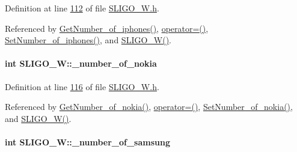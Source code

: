 Definition at line \hyperlink{_s_l_i_g_o___w_8h_source_l00112}{112} of file \hyperlink{_s_l_i_g_o___w_8h_source}{S\+L\+I\+G\+O\+\_\+\+W.\+h}.



Referenced by \hyperlink{_s_l_i_g_o___w_8cpp_source_l00113}{Get\+Number\+\_\+of\+\_\+iphones()}, \hyperlink{_s_l_i_g_o___w_8h_source_l00075}{operator=()}, \hyperlink{_s_l_i_g_o___w_8cpp_source_l00109}{Set\+Number\+\_\+of\+\_\+iphones()}, and \hyperlink{_s_l_i_g_o___w_8h_source_l00024}{S\+L\+I\+G\+O\+\_\+\+W()}.

\paragraph[{\texorpdfstring{\+\_\+number\+\_\+of\+\_\+nokia}{_number_of_nokia}}]{\setlength{\rightskip}{0pt plus 5cm}int S\+L\+I\+G\+O\+\_\+\+W\+::\+\_\+number\+\_\+of\+\_\+nokia\hspace{0.3cm}{\ttfamily [private]}}\hypertarget{class_s_l_i_g_o___w_a9fe78b9365c145432d58cb947b01111a_a9fe78b9365c145432d58cb947b01111a}{}\label{class_s_l_i_g_o___w_a9fe78b9365c145432d58cb947b01111a_a9fe78b9365c145432d58cb947b01111a}


Definition at line \hyperlink{_s_l_i_g_o___w_8h_source_l00116}{116} of file \hyperlink{_s_l_i_g_o___w_8h_source}{S\+L\+I\+G\+O\+\_\+\+W.\+h}.



Referenced by \hyperlink{_s_l_i_g_o___w_8cpp_source_l00081}{Get\+Number\+\_\+of\+\_\+nokia()}, \hyperlink{_s_l_i_g_o___w_8h_source_l00075}{operator=()}, \hyperlink{_s_l_i_g_o___w_8cpp_source_l00077}{Set\+Number\+\_\+of\+\_\+nokia()}, and \hyperlink{_s_l_i_g_o___w_8h_source_l00024}{S\+L\+I\+G\+O\+\_\+\+W()}.

\paragraph[{\texorpdfstring{\+\_\+number\+\_\+of\+\_\+samsung}{_number_of_samsung}}]{\setlength{\rightskip}{0pt plus 5cm}int S\+L\+I\+G\+O\+\_\+\+W\+::\+\_\+number\+\_\+of\+\_\+samsung\hspace{0.3cm}{\ttfamily [private]}}\hypertarget{class_s_l_i_g_o___w_a2c7845560ec14452132d659eb54f2cec_a2c7845560ec14452132d659eb54f2cec}{}\label{class_s_l_i_g_o___w_a2c7845560ec14452132d659eb54f2cec_a2c7845560ec14452132d659eb54f2cec}


